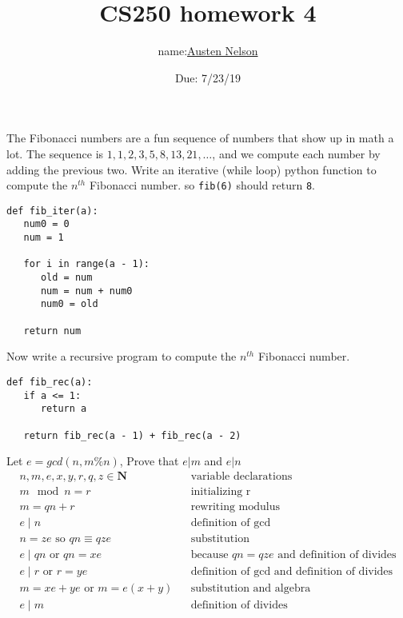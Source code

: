 \documentclass{exam}
\title{CS250 homework 4}
\author{name:\underline{Austen Nelson}}
\date{Due: 7/23/19}
\newcommand\N{\mathbf{N}}
\begin{document}
\maketitle

\begin{questions}

 
 
\question
The Fibonacci numbers are a fun sequence of numbers that show up in math a lot.
The sequence is $1,1,2,3,5,8,13,21,\ldots$, and we compute each number by adding the previous two.
Write an iterative (while loop) python function to compute the $n^{th}$ Fibonacci number.
so \texttt{fib(6)} should return \texttt 8.
\begin{lstlisting}
def fib_iter(a):
   num0 = 0
   num = 1

   for i in range(a - 1):
      old = num
      num = num + num0
      num0 = old

   return num
\end{lstlisting}

\question
Now write a recursive program to compute the $n^{th}$ Fibonacci number.
\begin{lstlisting}
def fib_rec(a):
   if a <= 1:
      return a

   return fib_rec(a - 1) + fib_rec(a - 2)
\end{lstlisting}

\question
Let $e = gcd(n,m\%n)$, Prove that $e | m$ and $e | n$ \\
\begin{align*}
   n, m, e, x, y, r, q, z \in \N && \text{variable declarations} \\
   m \mod n = r && \text{initializing r} \\
   m = qn + r && \text{rewriting modulus} \\
   e \mid n && \text{definition of gcd} \\
   n = ze \text{ so } qn \equiv qze && \text{substitution} \\
   e \mid qn \text{ or } qn = xe && \text{because $qn = qze$ and definition of divides} \\
   e \mid r \text{ or } r = ye && \text{definition of gcd and definition of divides} \\
   m = xe + ye \text{ or } m = e(x+y) && \text{substitution and algebra} \\
   e \mid m && \text{definition of divides}
\end{align*}


\end{questions}
\end{document}
